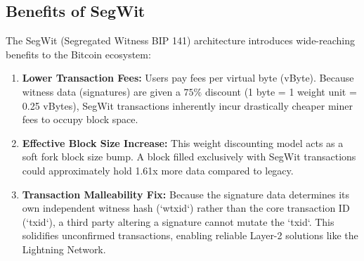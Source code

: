 \documentclass[12pt]{article}
\begin{document}
\subsection*{Benefits of SegWit}
The SegWit (Segregated Witness BIP 141) architecture introduces wide-reaching benefits to the Bitcoin ecosystem:
\begin{enumerate}
    \item \textbf{Lower Transaction Fees:} Users pay fees per virtual byte (vByte). Because witness data (signatures) are given a $75\%$ discount (1 byte = 1 weight unit = 0.25 vBytes), SegWit transactions inherently incur drastically cheaper miner fees to occupy block space.
    \item \textbf{Effective Block Size Increase:} This weight discounting model acts as a soft fork block size bump. A block filled exclusively with SegWit transactions could approximately hold 1.61x more data compared to legacy.
    \item \textbf{Transaction Malleability Fix:} Because the signature data determines its own independent witness hash (`wtxid`) rather than the core transaction ID (`txid`), a third party altering a signature cannot mutate the `txid`. This solidifies unconfirmed transactions, enabling reliable Layer-2 solutions like the Lightning Network.
\end{enumerate}
\end{document}
